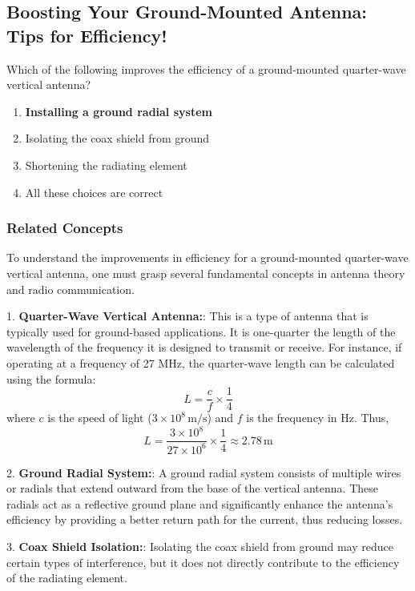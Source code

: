 \subsection{Boosting Your Ground-Mounted Antenna: Tips for Efficiency!}

\begin{tcolorbox}[colback=gray!10, colframe=black, title=E9A10] 
Which of the following improves the efficiency of a ground-mounted quarter-wave vertical antenna? 
\begin{enumerate}[label=\Alph*.]
    \item \textbf{Installing a ground radial system}
    \item Isolating the coax shield from ground
    \item Shortening the radiating element
    \item All these choices are correct
\end{enumerate} \end{tcolorbox}



\subsubsection{Related Concepts}

To understand the improvements in efficiency for a ground-mounted quarter-wave vertical antenna, one must grasp several fundamental concepts in antenna theory and radio communication.

1. \textbf{Quarter-Wave Vertical Antenna:}: This is a type of antenna that is typically used for ground-based applications. It is one-quarter the length of the wavelength of the frequency it is designed to transmit or receive. For instance, if operating at a frequency of 27 MHz, the quarter-wave length can be calculated using the formula:
   \[
   L = \frac{c}{f} \times \frac{1}{4}
   \]
   where \(c\) is the speed of light (\(3 \times 10^8 \, \text{m/s}\)) and \(f\) is the frequency in Hz. Thus, 
   \[
   L = \frac{3 \times 10^8}{27 \times 10^6} \times \frac{1}{4} \approx 2.78 \, \text{m}
   \]

2. \textbf{Ground Radial System:}: A ground radial system consists of multiple wires or radials that extend outward from the base of the vertical antenna. These radials act as a reflective ground plane and significantly enhance the antenna's efficiency by providing a better return path for the current, thus reducing losses.

3. \textbf{Coax Shield Isolation:}: Isolating the coax shield from ground may reduce certain types of interference, but it does not directly contribute to the efficiency of the radiating element. 

